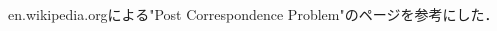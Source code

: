 \documentclass[uplatex, dvipdfmx]{jsarticle}
\begin{document}
\begin{thebibliography}{99}
    en.wikipedia.orgによる"Post Correspondence Problem"のページを参考にした．
    

\end{thebibliography}
\end{document}
